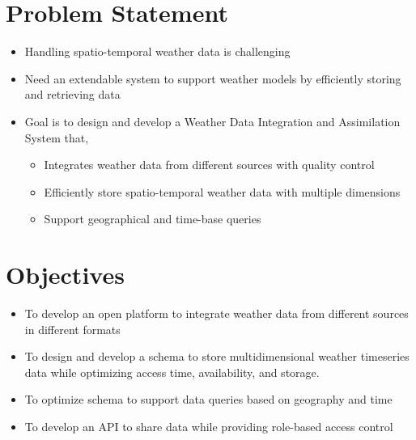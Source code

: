 \section{Problem Statement}
\begin{itemize}
    \item Handling spatio-temporal weather data is challenging
    \item Need an extendable system to support weather models by efficiently storing and retrieving data
    \item Goal is to design and develop a Weather Data Integration and Assimilation System that,
    \begin{itemize}
        \item Integrates weather data from different sources with quality control
        \item Efficiently store spatio-temporal weather data with multiple dimensions
        \item Support geographical and time-base queries
    \end{itemize}
\end{itemize}


\section{Objectives}
\begin{itemize}
    \item To develop an open platform to integrate weather data from different sources in different formats
    \item To design and develop a schema to store multidimensional weather timeseries data while optimizing access time, availability, and storage.
    \item To optimize schema to support data queries based on geography and time
    \item To develop an API to share data while providing role-based access control
\end{itemize}
